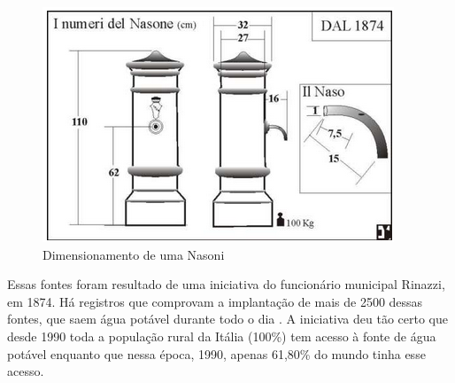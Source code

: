 	\begin{figure}[!htbp]
      \centering
      \includegraphics[scale=1]{editaveis/figuras/nasone}
      \caption[Dimensionamento de uma Nasoni]
      {Dimensionamento de uma Nasoni \cite{rodrigues}}
      \label{dimensionamento_nasoni}
    \end{figure}
    
    Essas fontes foram resultado de uma iniciativa do funcionário municipal Rinazzi, em 1874. Há registros que comprovam a implantação de mais de 2500 dessas fontes, que saem água potável durante todo o dia \cite{abc}. A iniciativa deu tão certo que desde 1990 toda a população rural da Itália (100\%) tem acesso à fonte de água potável enquanto que nessa época, 1990, apenas 61,80\% do mundo tinha esse acesso\cite{bank}.
    
